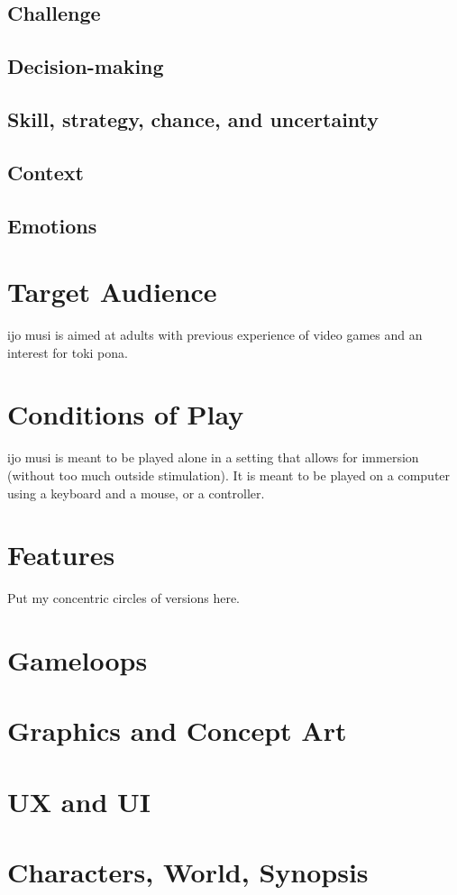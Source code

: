 \documentclass{scrartcl}
\begin{document}
		\subsection{Challenge}
		\subsection{Decision-making}
		\subsection{Skill, strategy, chance, and uncertainty}
		\subsection{Context}
		\subsection{Emotions}
	\section{Target Audience}
		ijo musi is aimed at adults with previous experience of video games and an interest for toki pona. 
	\section{Conditions of Play}
		ijo musi is meant to be played alone in a setting that allows for immersion (without too much outside stimulation). It is meant to be played on a computer using a keyboard and a mouse, or a controller. 
	\section{Features}
		Put my concentric circles of versions here.
	\section{Gameloops}
	\section{Graphics and Concept Art}
	\section{UX and UI}
	\section{Characters, World, Synopsis}
	
	
\end{document}
